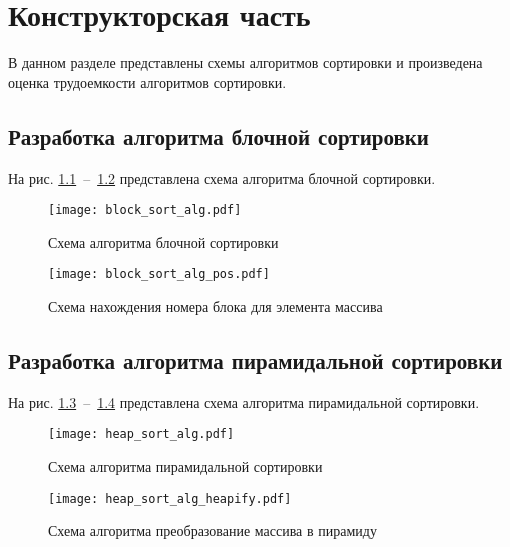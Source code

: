 \chapter{Конструкторская часть}

В данном разделе представлены схемы алгоритмов сортировки и произведена оценка трудоемкости алгоритмов сортировки.

\section{Разработка алгоритма блочной сортировки}
На рис. \ref{img:block_sort_alg}~--~\ref{img:block_sort_alg_pos} представлена схема алгоритма блочной сортировки.

\begin{figure}[h!]
\centering
    \texttt{[image: block\_sort\_alg.pdf]}
    \caption{Схема алгоритма блочной сортировки}
    \label{img:block_sort_alg}	
\end{figure}

\newpage

\begin{figure}[h!]
\centering
    \texttt{[image: block\_sort\_alg\_pos.pdf]}
    \caption{Схема нахождения номера блока для элемента массива}
    \label{img:block_sort_alg_pos}	
\end{figure}

\newpage

\section{Разработка алгоритма пирамидальной сортировки}
На рис. \ref{img:heap_sort_alg}~--~\ref{img:heap_sort_alg_heapify} представлена схема алгоритма пирамидальной сортировки.

\begin{figure}[h!]
\centering
    \texttt{[image: heap\_sort\_alg.pdf]}
    \caption{Схема алгоритма пирамидальной сортировки}
    \label{img:heap_sort_alg}	
\end{figure}

\newpage

\begin{figure}[h!]
\centering
    \texttt{[image: heap\_sort\_alg\_heapify.pdf]}
    \caption{Схема алгоритма преобразование массива в пирамиду}
    \label{img:heap_sort_alg_heapify}	
\end{figure}

\newpage

